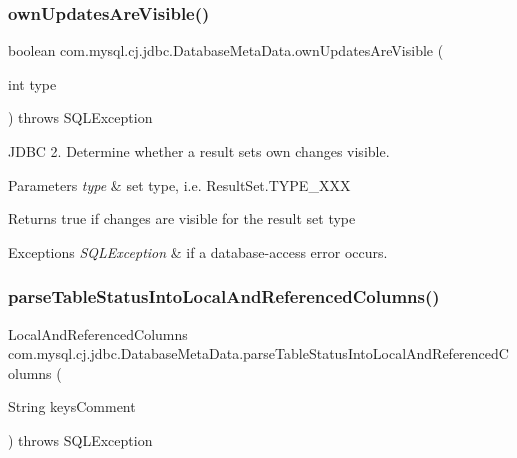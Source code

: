 \subsubsection{\texorpdfstring{own\+Updates\+Are\+Visible()}{ownUpdatesAreVisible()}}
{\footnotesize\ttfamily boolean com.\+mysql.\+cj.\+jdbc.\+Database\+Meta\+Data.\+own\+Updates\+Are\+Visible (\begin{DoxyParamCaption}\item[{int}]{type }\end{DoxyParamCaption}) throws S\+Q\+L\+Exception}

J\+D\+BC 2. Determine whether a result set\textquotesingle{}s own changes visible.


\begin{DoxyParams}{Parameters}
{\em type} & set type, i.\+e. Result\+Set.\+T\+Y\+P\+E\+\_\+\+X\+XX \\
\hline
\end{DoxyParams}
\begin{DoxyReturn}{Returns}
true if changes are visible for the result set type 
\end{DoxyReturn}

\begin{DoxyExceptions}{Exceptions}
{\em S\+Q\+L\+Exception} & if a database-\/access error occurs. \\
\hline
\end{DoxyExceptions}
\mbox{\label{classcom_1_1mysql_1_1cj_1_1jdbc_1_1_database_meta_data_a9a3bd2cd8affbc09ea36b63fb2ef22fe}} 
\subsubsection{\texorpdfstring{parse\+Table\+Status\+Into\+Local\+And\+Referenced\+Columns()}{parseTableStatusIntoLocalAndReferencedColumns()}}
{\footnotesize\ttfamily Local\+And\+Referenced\+Columns com.\+mysql.\+cj.\+jdbc.\+Database\+Meta\+Data.\+parse\+Table\+Status\+Into\+Local\+And\+Referenced\+Columns (\begin{DoxyParamCaption}\item[{String}]{keys\+Comment }\end{DoxyParamCaption}) throws S\+Q\+L\+Exception\hspace{0.3cm}{\ttfamily [protected]}}

